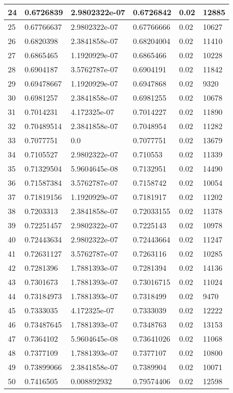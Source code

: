 \begin{longtable}{|l|l|l|l|l|l|}
24 & 0.6726839 & 2.9802322e-07 & 0.6726842 & 0.02 & 12885 \\ \hline 
25 & 0.67766637 & 2.9802322e-07 & 0.67766666 & 0.02 & 10627 \\ \hline 
26 & 0.6820398 & 2.3841858e-07 & 0.68204004 & 0.02 & 11410 \\ \hline 
27 & 0.6865465 & 1.1920929e-07 & 0.6865466 & 0.02 & 10228 \\ \hline 
28 & 0.6904187 & 3.5762787e-07 & 0.6904191 & 0.02 & 11842 \\ \hline 
29 & 0.69478667 & 1.1920929e-07 & 0.6947868 & 0.02 & 9320 \\ \hline 
30 & 0.6981257 & 2.3841858e-07 & 0.6981255 & 0.02 & 10678 \\ \hline 
31 & 0.7014231 & 4.172325e-07 & 0.7014227 & 0.02 & 11890 \\ \hline 
32 & 0.70489514 & 2.3841858e-07 & 0.7048954 & 0.02 & 11282 \\ \hline 
33 & 0.7077751 & 0.0 & 0.7077751 & 0.02 & 13679 \\ \hline 
34 & 0.7105527 & 2.9802322e-07 & 0.710553 & 0.02 & 11339 \\ \hline 
35 & 0.71329504 & 5.9604645e-08 & 0.7132951 & 0.02 & 14490 \\ \hline 
36 & 0.71587384 & 3.5762787e-07 & 0.7158742 & 0.02 & 10054 \\ \hline 
37 & 0.71819156 & 1.1920929e-07 & 0.7181917 & 0.02 & 11202 \\ \hline 
38 & 0.7203313 & 2.3841858e-07 & 0.72033155 & 0.02 & 11378 \\ \hline 
39 & 0.72251457 & 2.9802322e-07 & 0.7225143 & 0.02 & 10978 \\ \hline 
40 & 0.72443634 & 2.9802322e-07 & 0.72443664 & 0.02 & 11247 \\ \hline 
41 & 0.72631127 & 3.5762787e-07 & 0.7263116 & 0.02 & 10285 \\ \hline 
42 & 0.7281396 & 1.7881393e-07 & 0.7281394 & 0.02 & 14136 \\ \hline 
43 & 0.7301673 & 1.7881393e-07 & 0.73016715 & 0.02 & 11024 \\ \hline 
44 & 0.73184973 & 1.7881393e-07 & 0.7318499 & 0.02 & 9470 \\ \hline 
45 & 0.7333035 & 4.172325e-07 & 0.7333039 & 0.02 & 12222 \\ \hline 
46 & 0.73487645 & 1.7881393e-07 & 0.7348763 & 0.02 & 13153 \\ \hline 
47 & 0.7364102 & 5.9604645e-08 & 0.73641026 & 0.02 & 11068 \\ \hline 
48 & 0.7377109 & 1.7881393e-07 & 0.7377107 & 0.02 & 10800 \\ \hline 
49 & 0.73899066 & 2.3841858e-07 & 0.7389904 & 0.02 & 10071 \\ \hline 
50 & 0.7416505 & 0.008892932 & 0.79574406 & 0.02 & 12598 \\ \hline 
\end{longtable}